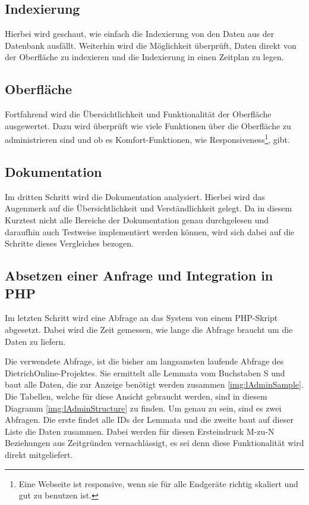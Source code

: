 \subsection{Indexierung}

Hierbei wird geschaut, wie einfach die Indexierung von den Daten aus der Datenbank ausfällt. Weiterhin wird die Möglichkeit überprüft, Daten direkt von der Oberfläche zu indexieren und die Indexierung in einen Zeitplan zu legen.

\subsection{Oberfläche}

Fortfahrend wird die Übersichtlichkeit und Funktionalität der Oberfläche ausgewertet. Dazu wird überprüft wie viele Funktionen über die Oberfläche zu administrieren sind und ob es Komfort-Funktionen, wie Responsiveness\footnote{Eine Webseite ist responsive, wenn sie für alle Endgeräte richtig skaliert und gut zu benutzen ist.}, gibt.

\subsection{Dokumentation}

Im dritten Schritt wird die Dokumentation analysiert. Hierbei wird das Augenmerk auf die Übersichtlichkeit und Verständlichkeit gelegt. Da in diesem Kurztest nicht alle Bereiche der Dokumentation genau durchgelesen und daraufhin auch Testweise implementiert werden können, wird sich dabei auf die Schritte dieses Vergleiches bezogen.

\subsection{Absetzen einer Anfrage und Integration in PHP}

Im letzten Schritt wird eine Abfrage an das System von einem PHP-Skript abgesetzt. Dabei wird die Zeit gemessen, wie lange die Abfrage braucht um die Daten zu liefern.

Die verwendete Abfrage, ist die bisher am langsamsten laufende Abfrage des DietrichOnline-Projektes. Sie ermittelt alle Lemmata vom Buchstaben S und baut alle Daten, die zur Anzeige benötigt werden zusammen \ref{img:lAdminSample}. Die Tabellen, welche für diese Ansicht gebraucht werden, sind in diesem Diagramm \ref{img:lAdminStructure} zu finden. Um genau zu sein, sind es zwei Abfragen. Die erste findet alle IDs der Lemmata und die zweite baut auf dieser Liste die Daten zusammen. Dabei werden für diesen Ersteindruck M-zu-N Beziehungen aus Zeitgründen vernachlässigt, es sei denn diese Funktionalität wird direkt mitgeliefert.

